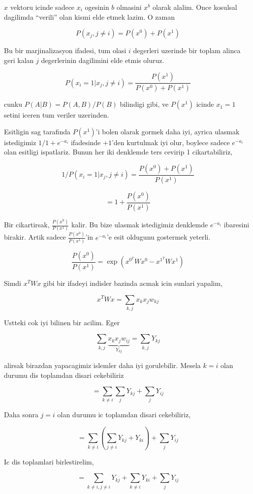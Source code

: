 \documentclass[12pt,fleqn]{article}\usepackage{../common}
\begin{document}
$x$ vektoru icinde sadece $x_i$ ogesinin $b$ olmasini $x^b$ olarak
alalim. Once kosulsal dagilimda ``verili'' olan kismi elde etmek lazim. O
zaman

$$ P(x_j,j \ne i) = P(x^0) + P(x^1) $$

Bu bir marjinalizasyon ifadesi, tum olasi $i$ degerleri uzerinde bir toplam
alinca geri kalan $j$ degerlerinin dagilimini elde etmis oluruz. 

$$  P(x_i = 1 | x_j,j \ne i)  = \frac{P(x^1)}{P(x^0) + P(x^1)} $$

cunku $P(A|B) = P(A,B) / P(B)$ bilindigi gibi, ve $P(x^1)$ icinde $x_1=1$
setini iceren tum veriler uzerinden. 

Esitligin sag tarafinda $P(x^1)$'i bolen olarak gormek daha iyi, ayrica
ulasmak istedigimiz $1/1 + e^{-a_i}$ ifadesinde $+1$'den kurtulmak iyi
olur, boylece sadece $e^{-a_i}$ olan esitligi ispatlariz. Bunun her iki
denklemde ters cevirip 1 cikartabiliriz,

$$  1 / P(x_i = 1 | x_j,j \ne i) = \frac{P(x^0) + P(x^1)}{P(x^1)} 
$$

$$= 
1 + \frac{ P(x^0)}{P(x^1)}
$$

Bir cikartirsak, $\frac{ P(x^0)}{P(x^1)}$ kalir. Bu bize ulasmak
istedigimiz denklemde $e^{-a_i}$ ibaresini birakir. Artik sadece $\frac{
  P(x^0)}{P(x^1)}$'in $e^{-a_i}$'e esit oldugunu gostermek 
yeterli. 


$$ 
\frac{ P(x^0)}{P(x^1)} = \exp( x^{0^T}Wx^0 -   x^{1^T}Wx^1 )
$$

Simdi $x^TWx$ gibi bir ifadeyi indisler bazinda acmak icin sunlari yapalim, 


$$ x^TWx = \sum_{k,j} x_kx_jw_{kj} $$

Ustteki cok iyi bilinen bir acilim. Eger

$$  \sum_{k,j} \underbrace{x_kx_jw_{ij}}_{Y_{kj}} = \sum_{k,j}Y_{kj} $$

alirsak birazdan yapacagimiz islemler daha iyi gorulebilir. Mesela $k=i$
olan durumu dis toplamdan disari cekebiliriz

$$ 
= \sum_{k \ne i}\sum_j Y_{kj} + \sum_{j} Y_{ij}
$$

Daha sonra $j = i$ olan durumu ic toplamdan disari cekebiliriz, 


$$ 
= \sum_{k \ne i}( \sum_{j \ne i} Y_{kj} + Y_{ki}) + \sum_{j} Y_{ij}
$$

Ic dis toplamlari birlestirelim,


$$ 
= \sum_{k \ne i,j \ne i} Y_{kj} + \sum_{k \ne i}  Y_{ki} + \sum_{j} Y_{ij}
$$
\end{document}
